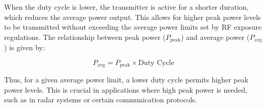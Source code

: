 When the duty cycle is lower, the transmitter is active for a shorter duration, which reduces the average power output. This allows for higher peak power levels to be transmitted without exceeding the average power limits set by RF exposure regulations. The relationship between peak power (\( P_{\text{peak}} \)) and average power (\( P_{\text{avg}} \)) is given by:

\[
P_{\text{avg}} = P_{\text{peak}} \times \text{Duty Cycle}
\]

Thus, for a given average power limit, a lower duty cycle permits higher peak power levels. This is crucial in applications where high peak power is needed, such as in radar systems or certain communication protocols.


